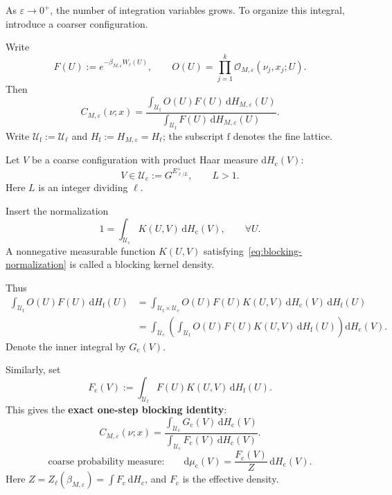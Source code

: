 \documentclass[10pt,reqno]{amsart}
\theoremstyle{definition}
\theoremstyle{remark}
\numberwithin{equation}{section}
\numberwithin{figure}{section}
\newcommand{\dd}{\mathrm d}
\newcommand{\e}{\varepsilon}
\newcommand{\Uf}{\mathcal U_{\mathrm f}}
\newcommand{\Uc}{\mathcal U_{\mathrm c}}
\newcommand{\Hf}{H_{\mathrm f}}
\newcommand{\Hc}{H_{\mathrm c}}
\newcommand{\Fc}{F_{\mathrm c}}
\newcommand{\Gc}{G_{\mathrm c}}
\newcommand{\muc}{\mu_{\mathrm c}}
\begin{document}
As $\e\to0^+$, the number of integration variables grows. To organize this integral, introduce a coarser configuration.

Write
\begin{equation}\label{eq:display-032}
F(U):=e^{-\beta_{M,\e}W_\ell(U)},
\qquad
O(U)=\prod_{j=1}^k\mathcal O_{M,\e}(\nu_j,x_j;U).
\end{equation}
Then
\begin{equation}\label{eq:display-033}
C_{M,\e}(\nu;x)
 =\frac{\displaystyle\int_{\Uf}O(U)F(U)\,\dd H_{M,\e}(U)}
 {\displaystyle\int_{\Uf}F(U)\,\dd H_{M,\e}(U)}.
\end{equation}
Write $\Uf:=\mathcal U_\ell$ and $\Hf:=H_{M,\e}=H_\ell$; the subscript $\mathrm f$ denotes the fine lattice.

Let $V$ be a coarse configuration with product Haar measure $\dd\Hc(V)$:
\begin{equation}\label{eq:display-034}
V\in\Uc:=G^{E^+_{\ell/L}},\qquad L>1.
\end{equation}
Here $L$ is an integer dividing $\ell$.

Insert the normalization
\begin{equation}\label{eq:blocking-normalization}
1=\int_{\Uc}K(U,V)\,\dd\Hc(V),\qquad\forall U.
\end{equation}
A nonnegative measurable function $K(U,V)$ satisfying~\eqref{eq:blocking-normalization} is called a blocking kernel density.

Thus
\begin{equation}\label{eq:display-036}
\begin{aligned}
\int_{\Uf}O(U)F(U)\,\dd\Hf(U)
&=\int_{\Uf\times\Uc}O(U)F(U)K(U,V)\,\dd\Hc(V)\,\dd\Hf(U)\\
&=\int_{\Uc}\left(\int_{\Uf}O(U)F(U)K(U,V)\,\dd\Hf(U)\right)\dd\Hc(V).
\end{aligned}
\end{equation}
Denote the inner integral by $\Gc(V)$.

Similarly, set
\begin{equation}\label{eq:coarse-density}
\Fc(V):=\int_{\Uf}F(U)K(U,V)\,\dd\Hf(U).
\end{equation}
This gives the \textbf{exact one-step blocking identity}:
\begin{equation}\label{eq:display-038}
C_{M,\e}(\nu;x)
 =\frac{\displaystyle\int_{\Uc}\Gc(V)\,\dd\Hc(V)}
 {\displaystyle\int_{\Uc}\Fc(V)\,\dd\Hc(V)}.
\end{equation}
\begin{equation}\label{eq:display-039}
\text{coarse probability measure:}\qquad
\dd\muc(V)=\frac{\Fc(V)}{Z}\,\dd\Hc(V).
\end{equation}
Here $Z=Z_\ell(\beta_{M,\e})=\int\Fc\,\dd\Hc$, and $\Fc$ is the effective density.
\end{document}
